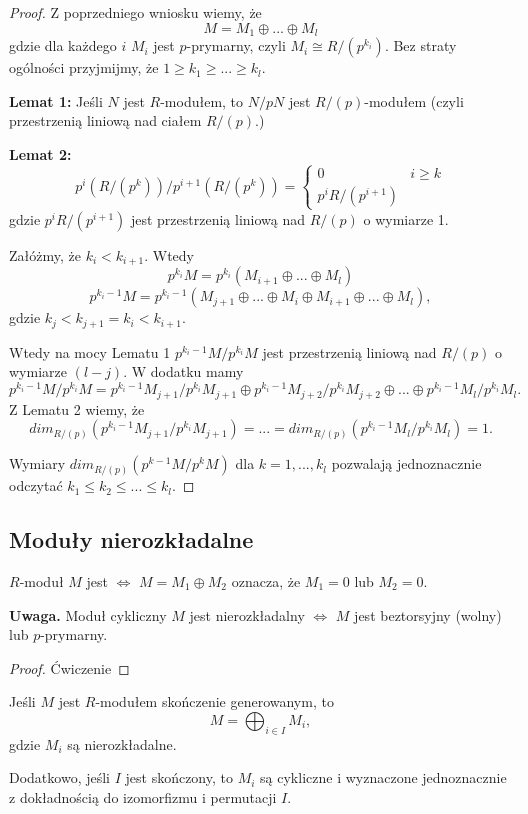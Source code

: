 \begin{proof}
 Z poprzedniego wniosku wiemy, że
 $$M=M_1\oplus...\oplus M_l$$
 gdzie dla każdego $i$ $M_i$ jest $p$-prymarny, czyli $M_i\cong R/(p^{k_i})$. Bez straty ogólności przyjmijmy, że $1\geq k_1\geq...\geq k_l$.

 \textbf{\color{blue}Lemat 1:} Jeśli $N$ jest $R$-modułem, to $N/pN$ jest $R/(p)$-modułem (czyli przestrzenią liniową nad ciałem $R/(p)$.)

 \textbf{\color{blue}Lemat 2:} 
 $$p^i(R/(p^k))/p^{i+1}(R/(p^k))=\begin{cases}0 & i\geq k\\p^iR/(p^{i+1})\end{cases}$$
 gdzie $p^iR/(p^{i+1})$ jest przestrzenią liniową nad $R/(p)$ o wymiarze 1.
  \bigskip

 Załóżmy, że $k_i<k_{i+1}$. Wtedy
 $$p^{k_i}M=p^{k_i}(M_{i+1}\oplus...\oplus M_l)$$
 $$p^{k_i-1}M=p^{k_i-1}(M_{j+1}\oplus...\oplus M_i\oplus M_{i+1}\oplus ...\oplus M_l),$$
 gdzie $k_j<k_{j+1}=k_i<k_{i+1}$.

 Wtedy na mocy {\color{blue}Lematu 1} $p^{k_{i}-1}M/p^{k_i}M$ jest przestrzenią liniową nad $R/(p)$ o wymiarze $(l-j)$. W dodatku mamy
 $$p^{k_i-1}M/p^{k_i}M=p^{k_i-1}M_{j+1}/p^{k_i}M_{j+1}\oplus p^{k_i-1}M_{j+2}/p^{k_i}M_{j+2}\oplus...\oplus p^{k_i-1}M_l/p^{k_i}M_l.$$
 Z {\color{blue}Lematu 2} wiemy, że
 $$dim_{R/(p)}(p^{k_i-1}M_{j+1}/p^{k_i}M_{j+1})=...=dim_{R/(p)}(p^{k_i-1}M_l/p^{k_i}M_l)=1.$$

 Wymiary $dim_{R/(p)}(p^{k-1}M/p^kM)$ dla $k=1,...,k_l$ pozwalają jednoznacznie odczytać $k_1\leq k_2\leq ...\leq k_l$.
\end{proof}

\subsection{Moduły nierozkładalne}

\begin{definition}
  $R$-moduł $M$ jest  $\iff$ $M=M_1\oplus M_2$ oznacza, że $M_1=0$ lub $M_2=0$.
\end{definition}

\textbf{\large\color{blue}Uwaga.} Moduł cykliczny $M$ jest nierozkładalny $\iff$ $M$ jest beztorsyjny (wolny) lub $p$-prymarny.

\begin{proof} Ćwiczenie
\end{proof}

\begin{theorem} Jeśli $M$ jest $R$-modułem skończenie generowanym, to 
  $$M=\bigoplus_{i\in I} M_i,$$
  gdzie $M_i$ są nierozkładalne.

  Dodatkowo, jeśli $I$ jest skończony, to $M_i$ są cykliczne i wyznaczone jednoznacznie z dokładnością do izomorfizmu i permutacji $I$.
\end{theorem}

